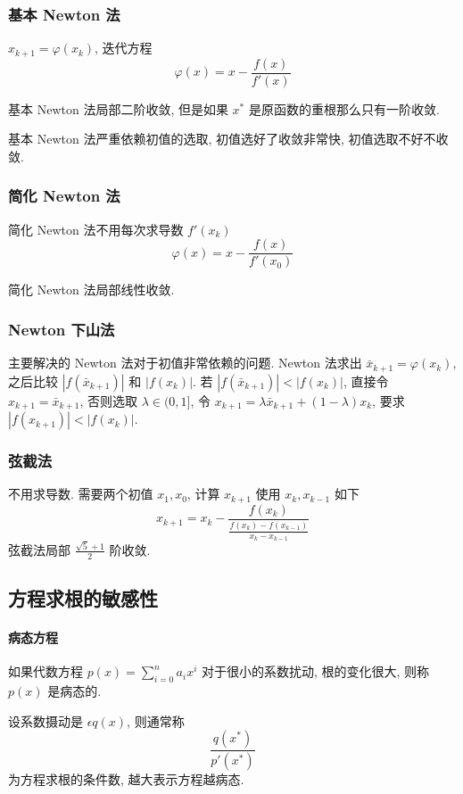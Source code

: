 \documentclass{ctexart}
\begin{document}
\subsubsection{基本 Newton 法}
    $x_{k+1} = \varphi(x_k)$, 迭代方程 \[
        \varphi(x) = x - \frac{f(x)}{f'(x)}\]
    \par
    基本 Newton 法局部二阶收敛, 但是如果 $x^*$ 是原函数的重根那么只有一阶收敛.\par
    基本 Newton 法严重依赖初值的选取, 初值选好了收敛非常快, 初值选取不好不收敛.
\subsubsection{简化 Newton 法}
    简化 Newton 法不用每次求导数 $f'(x_k)$\[
        \varphi(x) = x - \frac{f(x)}{f'(x_0)}\]
    \par
    简化 Newton 法局部线性收敛.\par
\subsubsection{Newton 下山法}
    主要解决的 Newton 法对于初值非常依赖的问题.
    Newton 法求出 $\bar{x}_{k+1} = \varphi(x_k)$,
    之后比较 $|f(\bar{x}_{k+1})|$ 和 $|f(x_k)|$.
    若 $|f(\bar{x}_{k+1})| < |f(x_k)|$, 直接令 $x_{k+1} = \bar{x}_{k+1}$,
    否则选取 $\lambda \in (0, 1]$,
    令 $x_{k+1} = \lambda \bar{x}_{k+1} + (1-\lambda) x_k$,
    要求 $|f(x_{k+1})| < |f(x_k)|$.
\subsubsection{弦截法}
    不用求导数.
    需要两个初值 $x_1, x_0$, 计算 $x_{k+1}$ 使用 $x_k, x_{k-1}$ 如下 \[
        x_{k+1} = x_k - \frac{f(x_k)}{\frac{f(x_k) - f(x_{k-1})}{x_k - x_{k-1}}}\]
    弦截法局部 $\frac{\sqrt{5}+1}{2}$ 阶收敛.

\subsection{方程求根的敏感性}
\paragraph{病态方程}
    如果代数方程 $p(x) = \sum_{i=0}^n a_i x^i$ 对于很小的系数扰动,
    根的变化很大, 则称 $p(x)$ 是病态的.\par
    设系数摄动是 $\epsilon q(x)$, 则通常称\[
        \frac{q(x^*)}{p'(x^*)}\]
    为方程求根的条件数, 越大表示方程越病态. 
\end{document}
